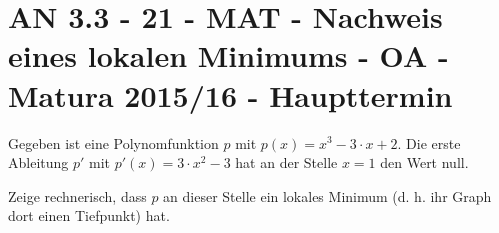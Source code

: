 \section{AN 3.3 - 21 - MAT - Nachweis eines lokalen Minimums - OA - Matura 2015/16 - Haupttermin}

\begin{beispiel}[AN 3.3]{1} %
Gegeben ist eine Polynomfunktion $p$ mit $p(x) = x^3 - 3 \cdot x + 2$. Die erste Ableitung $p'$ mit $p'(x) = 3 \cdot x^2 - 3$ hat an der Stelle $x = 1$ den Wert null. \leer

Zeige rechnerisch, dass $p$ an dieser Stelle ein lokales Minimum (d. h. ihr Graph dort einen
Tiefpunkt) hat.

\end{beispiel}